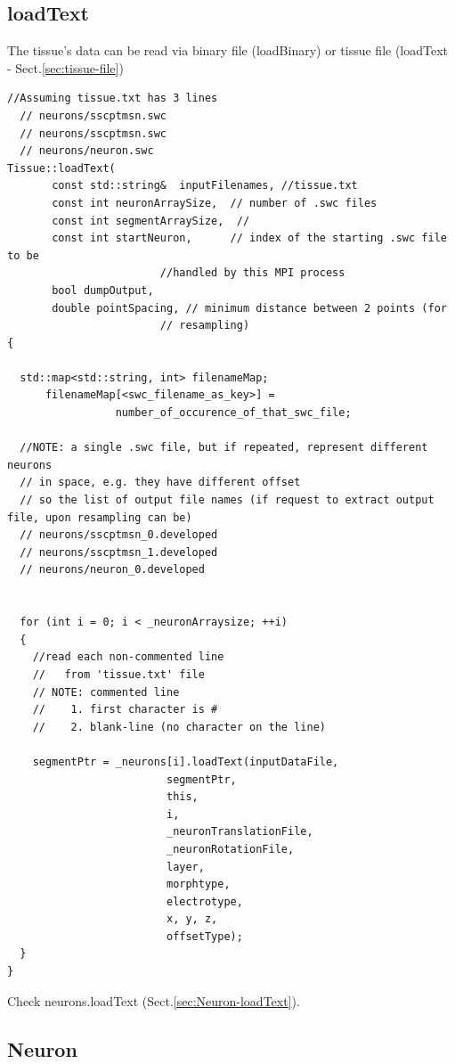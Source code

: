 \subsection{loadText}
\label{sec:Tissue-loadText}

The tissue's data can be read via binary file (loadBinary) or tissue file
(loadText - Sect.\ref{sec:tissue-file})

\begin{verbatim}
//Assuming tissue.txt has 3 lines
  // neurons/sscptmsn.swc
  // neurons/sscptmsn.swc
  // neurons/neuron.swc
Tissue::loadText(   
       const std::string&  inputFilenames, //tissue.txt
       const int neuronArraySize,  // number of .swc files
       const int segmentArraySize,  //
       const int startNeuron,      // index of the starting .swc file to be
                        //handled by this MPI process
       bool dumpOutput,
       double pointSpacing, // minimum distance between 2 points (for
                        // resampling)                       
{

  std::map<std::string, int> filenameMap;
      filenameMap[<swc_filename_as_key>] =
                 number_of_occurence_of_that_swc_file;
      
  //NOTE: a single .swc file, but if repeated, represent different neurons
  // in space, e.g. they have different offset
  // so the list of output file names (if request to extract output file, upon resampling can be)
  // neurons/sscptmsn_0.developed
  // neurons/sscptmsn_1.developed
  // neurons/neuron_0.developed
   
  
  for (int i = 0; i < _neuronArraysize; ++i)
  {
    //read each non-commented line 
    //   from 'tissue.txt' file
    // NOTE: commented line
    //    1. first character is #
    //    2. blank-line (no character on the line)
  
    segmentPtr = _neurons[i].loadText(inputDataFile, 
                         segmentPtr,
                         this,
                         i,
                         _neuronTranslationFile,
                         _neuronRotationFile,
                         layer,
                         morphtype,
                         electrotype,
                         x, y, z,
                         offsetType);
  }   
}                        
\end{verbatim}
Check neurons.loadText (Sect.\ref{sec:Neuron-loadText}).

\subsection{Neuron}
\label{sec:Neuron}

